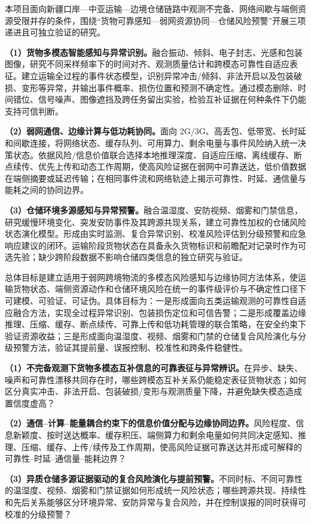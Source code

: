 \justifying
\NSFCBodyText


本项目面向新疆口岸—中亚运输—边境仓储链路中观测不完备、网络间歇与端侧资源受限并存的条件，围绕“货物可靠感知—弱网资源协同—仓储风险预警”开展三项递进且可独立验证的研究。

\textbf{（1）货物多模态智能感知与异常识别。}融合振动、倾斜、电子封志、光感和包装图像，研究不同采样频率下的时间对齐、观测质量估计和跨模态可靠性自适应表征。建立运输全过程的事件状态模型，识别异常冲击/倾斜、非法开启以及包装破损、变形等异常，并输出事件概率、损伤位置和预测不确定性。通过模态删除、时间错位、信号噪声、图像遮挡及跨任务留出实验，检验互补证据在何种条件下仍能支持可信判断。

\textbf{（2）弱网通信、边缘计算与低功耗协同。}面向 2G/3G、高丢包、低带宽、长时延和间歇连接，将网络状态、缓存队列、可用算力、剩余电量与事件风险纳入统一决策状态。依据风险/信息价值联合选择本地推理深度、自适应压缩、离线缓存、断点续传、优先上传和动态工作周期，使高风险证据在弱网中可靠送达，低价值数据在端侧摘要或延迟传输；在相同事件流和网络轨迹上揭示可靠性、时延、通信量与能耗之间的协同边界。

\textbf{（3）仓储环境多源感知与异常预警。}融合温湿度、安防视频、烟雾和门禁信息，研究缓慢环境变化、突发安防事件及其跨源共现关系，建立可靠性加权的仓储风险状态演化模型。形成由实时监测、复合异常识别、校准风险评估到分级预警和应急响应建议的闭环。运输阶段货物状态在具备永久货物标识和前瞻配对记录时作为可选先验；缺少跨阶段数据不影响仓储四类信息的独立研究与验证。


总体目标是建立适用于弱网跨境物流的多模态风险感知与边缘协同方法体系，使运输货物状态、端侧资源动作和仓储环境风险在统一的事件级评价与不确定性口径下可建模、可验证、可证伪。具体目标为：一是形成面向五类运输观测的可靠性自适应融合方法，实现全过程异常识别、包装损伤定位和可信告警；二是形成覆盖边缘推理、压缩、缓存、断点续传、可靠上传和低功耗管理的联合策略，在安全约束下验证资源收益；三是形成面向温湿度、视频、烟雾和门禁的仓储复合风险演化与分级预警方法，验证其提前量、误报控制、校准性和跨条件稳健性。


\textbf{（1）不完备观测下货物多模态互补信息的可靠表征与异常辨识。}在异步、缺失、噪声和可靠性漂移共同存在时，哪些跨模态互补关系仍能稳定表征货物状态；如何区分真实冲击、非法开启、包装破损/变形与观测质量下降，并避免缺失模态造成置信度虚高？

\textbf{（2）通信--计算--能量耦合约束下的信息价值分配与边缘协同边界。}风险程度、信息新颖度、按时送达概率、缓存积压、端侧算力和剩余电量如何共同决定感知、推理、压缩、缓存、上传/续传及工作周期，使高风险证据可靠送达并形成可解释的可靠性--时延--通信量--能耗边界？

\textbf{（3）异质仓储多源证据驱动的复合风险演化与提前预警。}不同时标、不同可靠性的温湿度、视频、烟雾和门禁证据如何形成统一风险状态；哪些跨源共现、持续性和先后关系能够区分环境异常、安防异常与复合风险，并在控制误报的同时获得可校准的分级预警？
